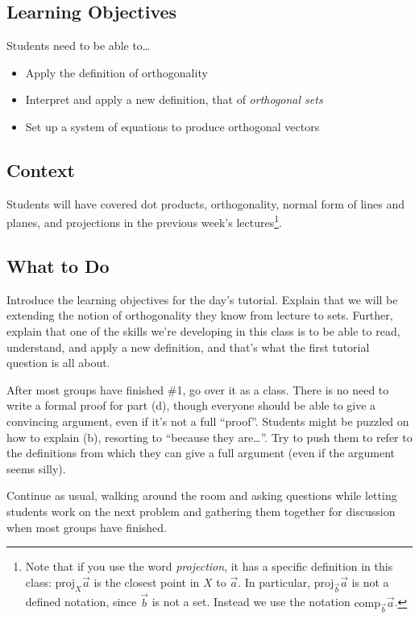 \documentclass[red]{tutorial}
\newcommand{\Proj}{\mathrm{proj}}
\newcommand{\Comp}{\mathrm{comp}}
\theoremstyle{definition}
\theoremstyle{theorem}
\begin{document}
	\begin{instructions}
\subsection*{Learning Objectives}
	Students need to be able to\ldots
	\begin{itemize}
		\item Apply the definition of orthogonality
		\item Interpret and apply a new definition, that of \emph{orthogonal sets}
		\item Set up a system of equations to produce orthogonal vectors
	\end{itemize}

\subsection*{Context}
	Students will have covered dot products, orthogonality, normal form of lines and planes, and
		projections in the previous week's lectures\footnote{ Note that if you use the word \emph{projection},
		it has a specific definition in this class: $\Proj_{X}\vec a$ is the closest point in $X$
		to $\vec a$. In particular, $\Proj_{\vec b}\vec a$ is not a defined notation, since $\vec b$ is
		not a set. Instead we use the notation $\Comp_{\vec b}\vec a$.}.

\subsection*{What to Do}
	Introduce the learning objectives for the day's tutorial. Explain that we will be extending
		the notion of orthogonality they know from lecture to sets. Further, explain that one of the skills
		we're developing in this class is to be able to read, understand, and apply a new definition, and that's
		what the first tutorial question is all about.

	
	After most groups have finished \#1, go over it as a class. There is no need to write a formal
		proof for part (d), though everyone should be able to give a convincing argument, even
		if it's not a full ``proof''. Students might be puzzled on how to explain (b),
		resorting to ``because they are\ldots''. Try to push them to refer to the definitions
		from which they can give a full argument (even if the argument seems silly).

	Continue as usual, walking around the room and asking
		questions while letting students work on the next problem and gathering them together
		for discussion when most groups have finished.


\end{instructions}
\end{document}
